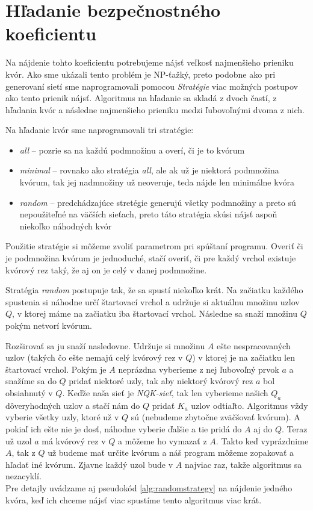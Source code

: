 \section {Hľadanie bezpečnostného koeficientu}

Na nájdenie tohto koeficientu potrebujeme nájsť veľkosť najmenšieho prieniku kvór.
Ako sme ukázali tento problém je NP-ťažký, preto podobne ako pri generovaní sietí
sme naprogramovali pomocou \textit{Stratégie} viac možných postupov ako tento
prienik nájsť.
Algoritmus na hľadanie sa skladá z dvoch častí, z hľadania kvór a následne
najmenšieho prieniku medzi ľubovoľnými dvoma z nich.

Na hľadanie kvór sme naprogramovali tri stratégie:

\begin{itemize}
  \item \textit{all} -- pozrie sa na každú podmnožinu a overí, či je to kvórum
  \item \textit{minimal} -- rovnako ako stratégia \textit{all}, ale ak už je niektorá
                            podmnožina kvórum, tak jej nadmnožiny už neoveruje,
                            teda nájde len minimálne kvóra
  \item \textit{random} -- predchádzajúce stretégie generujú všetky podmnožiny a preto
                           sú nepoužiteľné na väčších sieťach, preto táto stratégia
                           skúsi nájsť aspoň niekoľko náhodných kvór
\end{itemize}

Použitie stratégie si môžeme zvoliť parametrom pri spúštaní programu.
Overiť či je podmnožina kvórum je jednoduché, stačí overiť, či pre každý vrchol existuje
kvórový rez taký, že aj on je celý v danej podmnožine.

Stratégia \textit{random} postupuje tak, že sa spustí niekoľko krát.
Na začiatku každého spustenia si náhodne určí štartovací vrchol a udržuje si aktuálnu
množinu uzlov $Q$, v ktorej máme na začiatku iba štartovací vrchol.
Následne sa snaží množinu $Q$  pokým netvorí kvórum.

Rozširovať sa ju snaží nasledovne. Udržuje si množinu $A$ ešte nespracovaných uzlov
(takých čo ešte nemajú celý kvórový rez v $Q$) v ktorej je na začiatku len štartovací
vrchol.
Pokým je $A$ neprázdna vyberieme z nej ľubovoľný prvok $a$ a snažíme sa do $Q$ pridať
niektoré uzly, tak aby niektorý kvórový rez $a$ bol obsiahnutý v $Q$. Keďže naša sieť
je \textit{NQK-sieť}, tak len vyberieme našich $Q_a$ dôveryhodných uzlov a stačí nám
do $Q$ pridať $K_a$ uzlov odtiaľto. Algoritmus vždy vyberie všetky uzly, ktoré už
v $Q$ sú (nebudeme zbytočne zväčšovať kvórum). A pokiaľ ich ešte nie je dosť, náhodne
vyberie ďalšie a tie pridá do $A$ aj do $Q$. Teraz už uzol $a$ má kvórový rez v $Q$
a môžeme ho vymazať z $A$. Takto keď vyprázdnime $A$, tak z $Q$ už budeme mať určite
kvórum a náš program môžeme zopakovať a hľadať iné kvórum. Zjavne každý uzol bude v $A$
najviac raz, takže algoritmus sa nezacyklí.\\
Pre detajly uvádzame aj pseudokód \ref{alg:randomstrategy} na nájdenie jedného kvóra,
keď ich chceme nájsť viac spustíme tento algoritmus viac krát.

